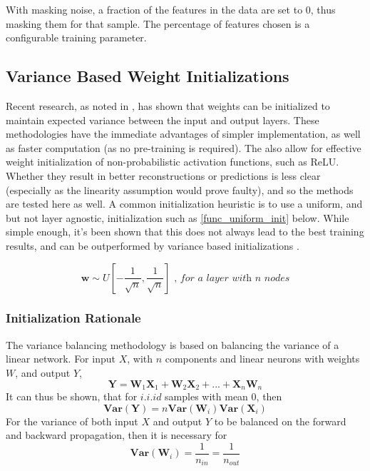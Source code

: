 \documentclass[a4paper,11pt,oneside]{article}
\theoremstyle{plain}
\theoremstyle{definition}
\begin{document}
With masking noise, a fraction of the features in the data are set to 0, thus masking them for that sample. The percentage of features chosen is a configurable training parameter.

\subsection{Variance Based Weight Initializations}\label{imp_weights}

Recent research, as noted in \cite{He}, has shown that weights can be initialized to maintain expected variance between the input and output layers. These methodologies have the immediate advantages of simpler implementation, as well as faster computation (as no pre-training is required). The also allow for effective weight initialization of non-probabilistic activation functions, such as ReLU. Whether they result in better reconstructions or predictions is less clear (especially as the linearity assumption would prove faulty), and so the methods are tested here as well. 
\newline\newline
A common initialization heuristic is to use a uniform, and but not layer agnostic, initialization such as \ref{func_uniform_init} below. While simple enough, it's been shown that this does not always lead to the best training results, and can be outperformed by variance based initializations \cite{Glorot}.

\begin{equation}\label{func_uniform_init}
\mathbf{w} \sim U\left[-\frac{1}{\sqrt{n}}, \frac{1}{\sqrt{n}}\right] \textit{ , for a layer with n nodes}
\end{equation}

\subsubsection{Initialization Rationale}

The variance balancing methodology is based on balancing the variance of a linear network. For input $X$, with $n$ components and linear neurons with weights $W$, and output $Y$,
\begin{equation}
\mathbf{Y} = \mathbf{W}_1\mathbf{X}_1 + \mathbf{W}_2\mathbf{X}_2 + ... + \mathbf{X}_n\mathbf{W}_n
\end{equation}
It can thus be shown, that for $i.i.id$ samples with mean $0$, then
\begin{equation}
\mathbf{Var(Y)} = n\mathbf{Var}(\mathbf{W}_i)\mathbf{Var}(\mathbf{X}_i)
\end{equation}
For the variance of both input $X$ and output $Y$ to be balanced on the forward and backward propagation, then it is necessary for
\begin{equation}
\mathbf{Var}(\mathbf{W}_i) = \frac{1}{n_{in}}= \frac{1}{n_{out}}
\end{equation}
\end{document}
